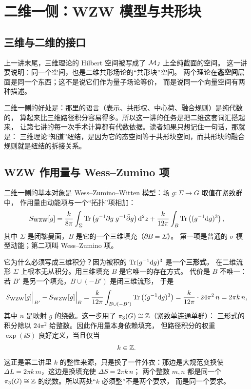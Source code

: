 \section{二维一侧：WZW 模型与共形块}

\subsection{三维与二维的接口}

上一讲末尾，三维理论的 Hilbert 空间被写成了 $\mathcal{M}_J$ 上全纯截面的空间。
这一讲要说明：同一个空间，也是二维共形场论的“共形块”空间。
两个理论在\textbf{态空间}层面是同一个东西；这不是说它们作为量子场论等价，
而是说同一个向量空间有两种描述。

二维一侧的好处是：那里的语言（表示、共形权、中心荷、融合规则）是纯代数的，
算起来比三维路径积分容易得多。所以这一讲的任务是把二维这套词汇搭起来，
让第七讲的每一次手术计算都有代数依据。读者如果只想记住一句话，那就是：
三维理论“知道”纽结，是因为它的态空间等于共形块空间，而共形块的融合规则就是纽结的拆接关系。

\subsection{WZW 作用量与 Wess--Zumino 项}

二维一侧的基本对象是 Wess--Zumino--Witten 模型：场 $g:\Sigma\to G$ 取值在紧致群中，
作用量由动能项与一个“拓扑”项相加：
\[
S_{\mathrm{WZW}}[g]
=\frac{k}{8\pi}\int_\Sigma \operatorname{Tr}\left(g^{-1}\partial g\;g^{-1}\bar\partial g\right)\mathrm{d}^2z
+\frac{k}{12\pi}\int_B \operatorname{Tr}\left((g^{-1}\mathrm{d} g)^3\right),
\]
其中 $\Sigma$ 是闭黎曼面，$B$ 是它的一个三维填充（$\partial B=\Sigma$）。
第一项是普通的 $\sigma$ 模型动能；第二项叫 Wess--Zumino 项。

它为什么必须写成三维积分？因为被积的 $\operatorname{Tr}(g^{-1}\mathrm{d} g)^3$ 是一个\textbf{三形式}，
在二维流形 $\Sigma$ 上根本无从积分。用三维填充 $B$ 是它唯一的存在方式。
代价是 $B$ 不唯一：若 $B'$ 是另一个填充，$B\cup(-B')$ 是闭三维流形，
于是
\[
S_{\mathrm{WZW}}[g]\Big|_{B'}-S_{\mathrm{WZW}}[g]\Big|_{B}
=\frac{k}{12\pi}\int_{B\cup(-B')}\operatorname{Tr}\left((g^{-1}\mathrm{d} g)^3\right)
=\frac{k}{12\pi}\cdot 24\pi^2\,n=2\pi k\,n,
\]
其中 $n$ 是映射 $g$ 的绕数。这一步用了 $\pi_3(G)\cong\mathbb{Z}$（紧致单连通单群）：
三形式的积分除以 $24\pi^2$ 给整数。因此作用量本身依赖填充，
但路径积分的权重 $\exp(\ii S)$ 良好定义，当且仅当
\[
k\in\mathbb{Z} .
\]
这正是第二讲里 $k$ 的整性来源，只是换了一件外衣：那边是大规范变换使
$\Delta L=2\pi k\,m$，这边是换填充使 $\Delta S=2\pi k\,n$；
两个整数 $m,n$ 都是同一个 $\pi_3(G)\cong\mathbb{Z}$ 的绕数。所以两处“$k$ 必须整”不是两个要求，
而是同一个要求。

